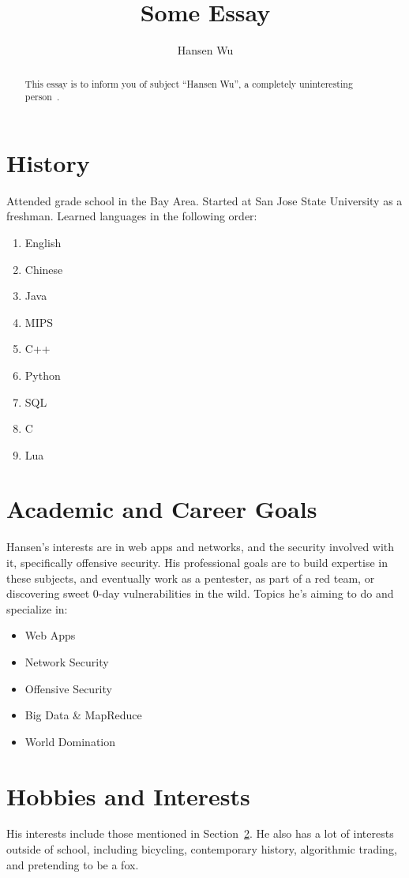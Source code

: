 \documentclass{article}
\begin{document}
\title{Some Essay}
\author{Hansen Wu}
\maketitle

\begin{abstract}
This essay is to inform you of subject ``Hansen Wu'', a completely uninteresting person~\cite{trustworthy_source}.
\end{abstract}

\section{History}\label{sec:history}

Attended grade school in the Bay Area. Started at San Jose State University as a freshman. Learned languages in the following order:
\begin{enumerate}
    \item English
    \item Chinese
    \item Java
    \item MIPS
    \item C++
    \item Python
    \item SQL
    \item C
    \item Lua
\end{enumerate}

\section{Academic and Career Goals}\label{sec:goals}

Hansen's interests are in web apps and networks, and the security involved with it, specifically offensive security. His professional goals are to build expertise in these subjects, and eventually work as a pentester, as part of a red team, or discovering sweet 0-day vulnerabilities in the wild.
Topics he's aiming to do and specialize in:
\begin{itemize}
    \item Web Apps
    \item Network Security
    \item Offensive Security
    \item Big Data \& MapReduce
    \item World Domination~\cite{another_trustworthy_source}
\end{itemize}

\section{Hobbies and Interests}\label{sec:hobbies}

His interests include those mentioned in Section~\ref{sec:goals}. He also has a lot of interests outside of school, including bicycling, contemporary history, algorithmic trading, and pretending to be a fox.



\end{document}
